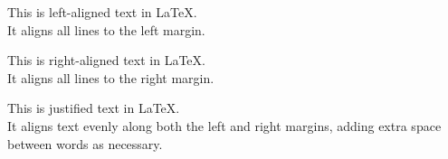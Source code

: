 \documentclass{article}
\begin{document}
\begin{flushleft}
This is left-aligned text in LaTeX. \\
It aligns all lines to the left margin.
\end{flushleft}
\begin{flushright}
This is right-aligned text in LaTeX. \\
It aligns all lines to the right margin.
\end{flushright}
\begin{justify}
This is justified text in LaTeX. \\
It aligns text evenly along both the left and right margins, adding extra space between words as necessary.
\end{justify}
\end{document}
